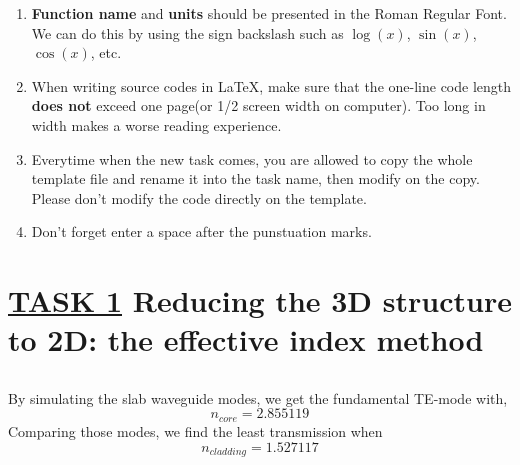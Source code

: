 \documentclass[fontsize=11pt]{scrartcl}
\begin{document}
\begin{enumerate}
    \item  \textbf{Function name} and \textbf{units} should be presented in the Roman Regular Font.
    We can do this by using the sign backslash such as $\log(x)$, $\sin(x)$, $\cos(x)$, etc.
    \item When writing source codes in \LaTeX, make sure that the one-line code length 
    \textbf{does not} exceed one page(or 1/2 screen width on computer). Too long in width makes 
    a worse reading experience.
    \item Everytime when the new task comes, you are allowed to copy the whole template file and 
    rename it into the task name, then modify on the copy. Please don't modify the code directly
    on the template.
    \item Don't forget enter a space after the punstuation marks.
\end{enumerate}



\pagebreak
\section{\uline{TASK 1} Reducing the 3D structure to 2D: the effective index method}
\subsection{}
By simulating the slab waveguide modes, we get the fundamental TE-mode with,
\begin{equation} 
    n_{core}=2.855119 
    \label{eq1}
\end{equation}
Comparing those modes, we find the least transmission when
\begin{equation} 
    n_{cladding}=1.527117 
    \label{eq2}
\end{equation}
\end{document}
